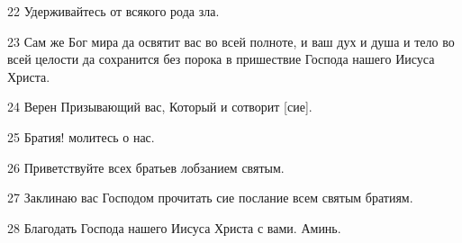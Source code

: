 \par 22 Удерживайтесь от всякого рода зла.
\par 23 Сам же Бог мира да освятит вас во всей полноте, и ваш дух и душа и тело во всей целости да сохранится без порока в пришествие Господа нашего Иисуса Христа.
\par 24 Верен Призывающий вас, Который и сотворит [сие].
\par 25 Братия! молитесь о нас.
\par 26 Приветствуйте всех братьев лобзанием святым.
\par 27 Заклинаю вас Господом прочитать сие послание всем святым братиям.
\par 28 Благодать Господа нашего Иисуса Христа с вами. Аминь.


